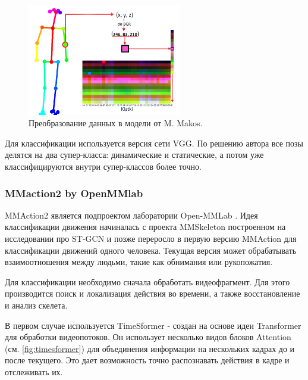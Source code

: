 \begin{figure}[h]
	\centering
	\includegraphics[width=0.6\textwidth]{./images/Classificators/MMakos_image_prep}
	\caption{Преобразование данных в модели от M. Makos. \cite{mmakos}}
	\label{fig:mmakos_image_prep}
\end{figure}
\hspace{1cm}

Для классификации используется версия сети VGG. По решению автора все позы делятся на два супер-класса: динамические и статические, а потом уже классифицируются внутри супер-классов более точно.



\subsubsection{MMaction2 by OpenMMlab}
\label{subsubsec:mmaction2_desc}

MMAction2 является подпроектом лаборатории Open-MMLab \cite{2020mmaction2}. Идея классификации движения начиналась с проекта MMSkeleton построенном на исследовании про ST-GCN \cite{STGCN} и позже переросло в первую версию MMAction для классификации движений одного человека. Текущая версия может обрабатывать взаимоотношения между людьми, такие как обнимания или рукопожатия. 

Для классификации необходимо сначала обработать видеофрагмент. Для этого производится поиск и локализация действия во времени, а также восстановление и анализ скелета.

В первом случае используется TimeSformer \cite{TimeSformer} - создан на основе идеи Transformer для обработки видеопотоков. Он использует несколько видов блоков Attention (см. \autoref{fig:timesformer}) для объединения информации на нескольких кадрах до и после текущего. Это дает возможность точно распознавать действия в кадре и отслеживать их.

